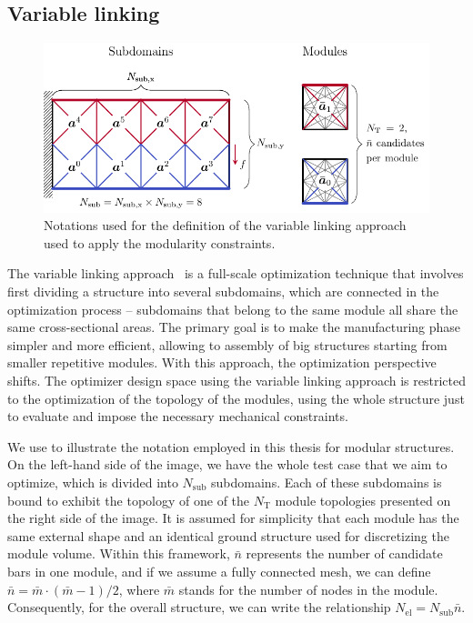 \subsection{Variable linking}
\begin{figure}
    \centering
    \includegraphics{figures/05_cellular_opt/00_modules_VL_bc/modules_bc.pdf}
    \caption{Notations used for the definition of the variable linking approach used to apply the modularity constraints.}
    \label{fig:05_VL}
\end{figure}

The variable linking approach~ is a full-scale optimization technique that involves first dividing a structure into several subdomains, which are connected in the optimization process -- \ie subdomains that belong to the same module all share the same cross-sectional areas. The primary goal is to make the manufacturing phase simpler and more efficient, allowing to assembly of big structures starting from smaller repetitive modules. With this approach, the optimization perspective shifts. The optimizer design space using the variable linking approach is restricted to the optimization of the topology of the modules, using the whole structure just to evaluate and impose the necessary mechanical constraints.

We use  to illustrate the notation employed in this thesis for modular structures. On the left-hand side of the image, we have the whole test case that we aim to optimize, which is divided into $N_\text{sub}$ subdomains. Each of these subdomains is bound to exhibit the topology of one of the $N_\text{T}$ module topologies presented on the right side of the image. It is assumed for simplicity that each module has the same external shape and an identical ground structure used for discretizing the module volume. Within this framework, $\bar{n}$ represents the number of candidate bars in one module, and if we assume a fully connected mesh, we can define $\bar{n} = \bar{m} \cdot (\bar{m}-1)/2$, where $\bar{m}$ stands for the number of nodes in the module. Consequently, for the overall structure, we can write the relationship $N_{\text{el}} = N_{\text{sub}}\bar{n}$.

